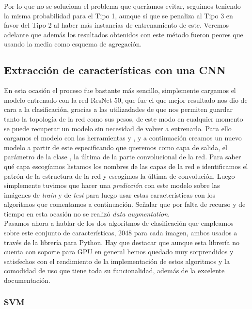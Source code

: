 Por lo que no se soluciona el problema que queríamos evitar, seguimos teniendo la misma probabilidad para el Tipo 1, aunque sí que se penaliza al Tipo 3 en favor del Tipo 2 al haber más instancias de entrenamiento de este. Veremos adelante que además los resultados obtenidos con este método fueron peores que usando la media como esquema de agregación.

\subsection{Extracción de características con una CNN}

En esta ocasión el proceso fue bastante más sencillo, simplemente cargamos el modelo entrenado con la red ResNet 50, que fue el que mejor resultado nos dio de cara a la clasificación, gracias a las utilizadades de  que nos permiten guardar tanto la topología de la red como sus pesos, de este modo en cualquier momento se puede recuperar un modelo sin necesidad de volver a entrenarlo. Para ello cargamos el modelo con las herramientas  y , y a continuación creamos un nuevo modelo a partir de este especificando que queremos como capa de salida, el parámetro  de la clase , la última de la parte convolucional de la red. Para saber qué capa escogíamos listamos los nombres de las capas de la red e identificamos el patrón de la estructura de la red y escogimos la última de convolución. Luego simplemente tuvimos que hacer una \textit{predicción} con este modelo sobre las imágenes de \textit{train} y de \textit{test} para luego usar estas características con los algoritmos que comentamos a continuación. Señalar que por falta de recurso y de tiempo en esta ocasión no se realizó \textit{data augmentation}.\\

Pasamos ahora a hablar de los dos algoritmos de clasificación que empleamos sobre este conjunto de características, 2048 para cada imagen,  ambos usados a través de la librería  para Python. Hay que destacar que aunque esta librería no cuenta con soporte para GPU en general hemos quedado muy sorprendidos y satisfechos con el rendimiento de la implementación de estos algoritmos y la comodidad de uso que tiene toda su funcionalidad, además de la excelente documentación.

\subsubsection{SVM}

